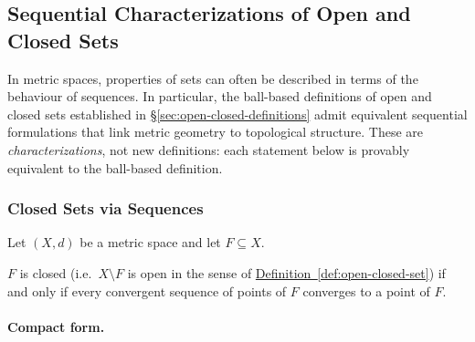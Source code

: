 %
%

\subsection{Sequential Characterizations of Open and Closed Sets}
\label{sec:sequential-characterizations}

In metric spaces, properties of sets can often be described
in terms of the behaviour of sequences.
In particular, the ball-based definitions of open and closed sets
established in \hyperref[sec:open-closed-definitions]{\S\ref*{sec:open-closed-definitions}}
admit equivalent sequential formulations that link metric geometry
to topological structure.
These are \emph{characterizations}, not new definitions: each statement
below is provably equivalent to the ball-based definition.

\subsubsection{Closed Sets via Sequences}

\begin{tcolorbox}[colback=propbox, colframe=propborder, arc=2pt,
  left=6pt, right=6pt, top=4pt, bottom=4pt,
  title={\small\textbf{Sequential Characterization (Closed Sets)}},
  fonttitle=\small\bfseries]
\label{def:closed-sequential}
Let $(X,d)$ be a metric space and let $F \subseteq X$.

\medskip
$F$ is closed (i.e.\ $X \setminus F$ is open in the sense of
\hyperref[def:open-closed-set]{Definition~\ref*{def:open-closed-set}})
if and only if every convergent sequence of points of $F$ converges to a
point of $F$.
\end{tcolorbox}

\paragraph{Compact form.}

